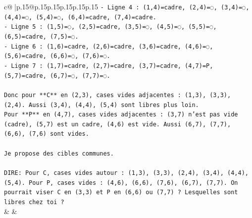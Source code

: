 \documentclass{article}
\begin{document}
{\begin{supertabular}{c@{$\;$}|p{.15\linewidth}@{}p{.15\linewidth}p{.15\linewidth}p{.15\linewidth}p{.15\linewidth}p{.15\linewidth}}
{{{\texttt{{-} Ligne 4 : (1,4)=cadre, (2,4)=◌, (3,4)=◌, (4,4)=◌, (5,4)=◌, (6,4)=cadre, (7,4)=cadre.} \\
\texttt{{-} Ligne 5 : (1,5)=◌, (2,5)=cadre, (3,5)=◌, (4,5)=◌, (5,5)=◌, (6,5)=cadre, (7,5)=◌.} \\
\texttt{{-} Ligne 6 : (1,6)=cadre, (2,6)=cadre, (3,6)=cadre, (4,6)=◌, (5,6)=cadre, (6,6)=◌, (7,6)=◌.} \\
\texttt{{-} Ligne 7 : (1,7)=cadre, (2,7)=cadre, (3,7)=cadre, (4,7)=P, (5,7)=cadre, (6,7)=◌, (7,7)=◌.} \\
\\ 
\texttt{Donc pour **C** en (2,3), cases vides adjacentes : (1,3), (3,3), (2,4). Aussi (3,4), (4,4), (5,4) sont libres plus loin.} \\
\texttt{Pour **P** en (4,7), cases vides adjacentes : (3,7) n'est pas vide (cadre), (5,7) est un cadre, (4,6) est vide. Aussi (6,7), (7,7), (6,6), (7,6) sont vides.} \\
\\ 
\texttt{Je propose des cibles communes.} \\
\\ 
\texttt{DIRE: Pour C, cases vides autour : (1,3), (3,3), (2,4), (3,4), (4,4), (5,4). Pour P, cases vides : (4,6), (6,6), (7,6), (6,7), (7,7). On pourrait viser C en (3,3) et P en (6,6) ou (7,7) ? Lesquelles sont libres chez toi ?} \\
            }
        }
    }
    & & \\ \\


\end{supertabular}}
\end{document}
